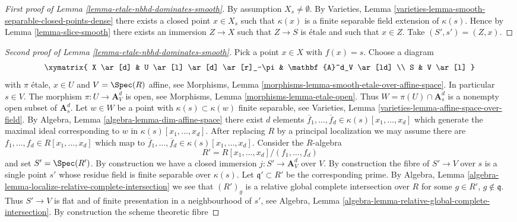 \begin{proof}[First proof of Lemma \ref{lemma-etale-nbhd-dominates-smooth}]
By assumption $X_s \not = \emptyset$. By
Varieties, Lemma \ref{varieties-lemma-smooth-separable-closed-points-dense}
there exists a closed point $x \in X_s$ such that $\kappa(x)$
is a finite separable field extension of $\kappa(s)$.
Hence by
Lemma \ref{lemma-slice-smooth}
there exists an immersion $Z \to X$ such that $Z \to S$ is \'etale and such
that $x \in Z$. Take $(S' , s') = (Z, x)$.
\end{proof}

\begin{proof}[Second proof of Lemma \ref{lemma-etale-nbhd-dominates-smooth}]
Pick a point $x \in X$ with $f(x) = s$.
Choose a diagram
$$
\xymatrix{
X \ar[d] & U \ar[l] \ar[d] \ar[r]_-\pi & \mathbf{A}^d_V \ar[ld] \\
S & V \ar[l]
}
$$
with $\pi$ \'etale, $x \in U$ and $V = \Spec(R)$ affine, see
Morphisms, Lemma \ref{morphisms-lemma-smooth-etale-over-affine-space}.
In particular $s \in V$. The morphism
$\pi : U \to \mathbf{A}^d_V$ is open, see
Morphisms, Lemma \ref{morphisms-lemma-etale-open}.
Thus $W = \pi(U) \cap \mathbf{A}^d_s$ is a nonempty open subset of
$\mathbf{A}^d_s$. Let $w \in W$ be a point with $\kappa(s) \subset \kappa(w)$
finite separable, see
Varieties, Lemma \ref{varieties-lemma-affine-space-over-field}.
By
Algebra, Lemma \ref{algebra-lemma-dim-affine-space}
there exist $d$ elements
$\overline{f}_1, \ldots, \overline{f}_d \in \kappa(s)[x_1, \ldots, x_d]$
which generate the maximal ideal corresponding to $w$ in
$\kappa(s)[x_1, \ldots, x_d]$.
After replacing $R$ by a principal localization
we may assume there are $f_1, \ldots, f_d \in R[x_1, \ldots, x_d]$
which map to
$\overline{f}_1, \ldots, \overline{f}_d \in \kappa(s)[x_1, \ldots, x_d]$.
Consider the $R$-algebra
$$
R' = R[x_1, \ldots, x_d]/(f_1, \ldots, f_d)
$$
and set $S' = \Spec(R')$. By construction we have a closed
immersion $j : S' \to \mathbf{A}^d_V$ over $V$.
By construction the fibre of $S' \to V$ over $s$ is a single
point $s'$ whose residue field is finite separable over $\kappa(s)$.
Let $\mathfrak q' \subset R'$ be the corresponding prime. By
Algebra, Lemma \ref{algebra-lemma-localize-relative-complete-intersection}
we see that $(R')_g$ is a relative global complete intersection over $R$
for some $g \in R'$, $g \not \in \mathfrak q$.
Thus $S' \to V$ is flat and of finite presentation in a
neighbourhood of $s'$, see
Algebra, Lemma \ref{algebra-lemma-relative-global-complete-intersection}.
By construction the scheme theoretic fibre

\end{proof}
